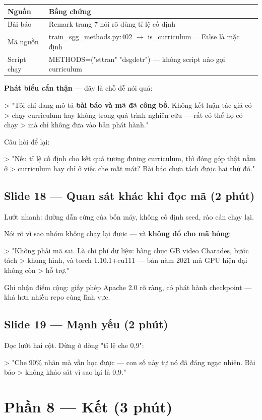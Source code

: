 \documentclass[11pt,a4paper]{article}
\newcommand{\code}[1]{{\ttfamily\small\color{codetext}#1}}
\begin{document}
\begin{center}\small
\begin{tabular}{@{}ll@{}}
\toprule
\textbf{Nguồn} & \textbf{Bằng chứng}\\
\midrule
Bài báo & Remark trang 7 nói rõ dùng tỉ lệ cố định\\
Mã nguồn & \code{train\_sgg\_methods.py:402} $\rightarrow$ \code{is\_curriculum = False} là mặc định\\
Script chạy & \code{METHODS=("sttran" "dsgdetr")} --- không script nào gọi curriculum\\
\bottomrule
\end{tabular}
\end{center}
\textbf{Phát biểu cẩn thận} --- đây là chỗ dễ nói quá:

> "Tôi chỉ đang mô tả \textbf{bài báo và mã đã công bố}. Không kết luận tác giả có > chạy curriculum hay không trong quá trình nghiên cứu --- rất có thể họ có chạy > mà chỉ không đưa vào bản phát hành."

Câu hỏi để lại:

> "Nếu tỉ lệ cố định cho kết quả tương đương curriculum, thì đóng góp thật nằm ở > curriculum hay chỉ ở việc che mất mát? Bài báo chưa tách được hai thứ đó."

\subsection{Slide 18 --- Quan sát khác khi đọc mã (2 phút)}
Lướt nhanh: đường dẫn cứng của bốn máy, không cố định seed, rào cản chạy lại.

Nói rõ vì sao nhóm không chạy lại được --- và \textbf{không đổ cho mã hỏng}:

> "Không phải mã sai. Là chi phí dữ liệu: hàng chục GB video Charades, bước tách > khung hình, và \code{torch 1.10.1+cu111} --- bản năm 2021 mà GPU hiện đại không còn > hỗ trợ."

Ghi nhận điểm cộng: giấy phép Apache 2.0 rõ ràng, có phát hành checkpoint --- khá hơn nhiều repo cùng lĩnh vực.

\subsection{Slide 19 --- Mạnh yếu (2 phút)}
Đọc lướt hai cột. Dừng ở dòng "tỉ lệ che 0,9":

> "Che 90\% nhãn mà vẫn học được --- con số này tự nó đã đáng ngạc nhiên. Bài báo > không khảo sát vì sao lại là 0,9."

\section{Phần 8 --- Kết (3 phút)}
\end{document}
